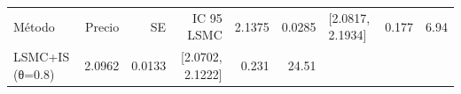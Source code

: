 \begin{tabular}{p{3.3cm}rrrrr}
\toprule
Método & Precio & SE & IC 95%
\midrule
LSMC & 2.1375 & 0.0285 & [2.0817, 2.1934] & 0.177 & 6.94 \\
LSMC+IS (θ=0.8) & 2.0962 & 0.0133 & [2.0702, 2.1222] & 0.231 & 24.51 \\
\bottomrule
\end{tabular}
